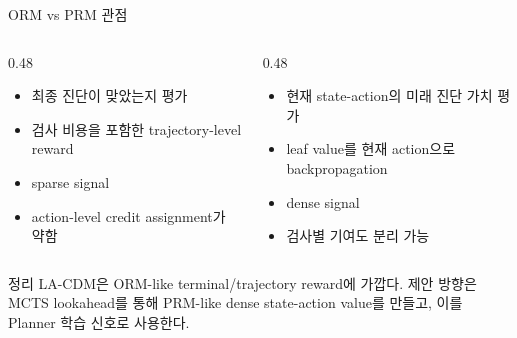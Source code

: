 \documentclass[
11pt,notheorems,hyperref={pdfauthor=whatever}
]{beamer}
\begin{document}
\begin{frame}{ORM vs PRM 관점}
\vspace{0.2em}
\begin{columns}[T,onlytextwidth]
\begin{column}{0.48\textwidth}
\begin{center}
\end{center}
\vspace{0.25em}
\scriptsize
\begin{itemize}
  \item 최종 진단이 맞았는지 평가
  \item 검사 비용을 포함한 trajectory-level reward
  \item sparse signal
  \item action-level credit assignment가 약함
\end{itemize}
\end{column}
\begin{column}{0.48\textwidth}
\begin{center}
\end{center}
\vspace{0.25em}
\scriptsize
\begin{itemize}
  \item 현재 state-action의 미래 진단 가치 평가
  \item leaf value를 현재 action으로 backpropagation
  \item dense signal
  \item 검사별 기여도 분리 가능
\end{itemize}
\end{column}
\end{columns}

\vspace{0.45em}
\begin{block}{정리}
\small
LA-CDM은 ORM-like terminal/trajectory reward에 가깝다. 제안 방향은 MCTS lookahead를 통해 PRM-like dense state-action value를 만들고, 이를 Planner 학습 신호로 사용한다.
\end{block}
\end{frame}
\end{document}
